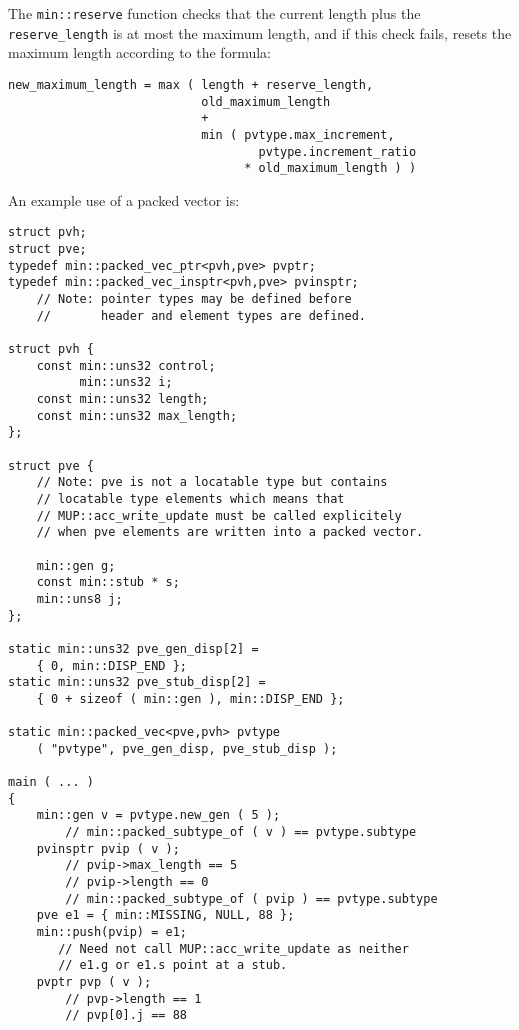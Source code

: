 \documentclass[12pt]{article}
\newenvironment{indpar}[1][0.3in]%
	{\begin{list}{}%
		     {\setlength{\itemsep}{0in}%
		      \setlength{\topsep}{0in}%
		      \setlength{\parsep}{1ex}%
		      \setlength{\labelwidth}{#1}%
		      \setlength{\leftmargin}{#1}%
		      \addtolength{\leftmargin}{\labelsep}}%
	 \item}%
	{\end{list}}
\begin{document}
The \verb|min::reserve| function checks that
the current length plus the \verb|reserve_length| is
at most the maximum length, and if this check fails,
resets the maximum length according to the formula:
\begin{indpar}\begin{verbatim}
new_maximum_length = max ( length + reserve_length,
                           old_maximum_length
                           +
                           min ( pvtype.max_increment,
                                   pvtype.increment_ratio
                                 * old_maximum_length ) )
\end{verbatim}\end{indpar}\label{PACKED-VEC-EXPANSION-FORMULA}

An example use of a packed vector is:
\begin{indpar}\begin{verbatim}
struct pvh;
struct pve;
typedef min::packed_vec_ptr<pvh,pve> pvptr;
typedef min::packed_vec_insptr<pvh,pve> pvinsptr;
    // Note: pointer types may be defined before
    //       header and element types are defined.

struct pvh {
    const min::uns32 control;
          min::uns32 i;
    const min::uns32 length;
    const min::uns32 max_length;
};

struct pve {
    // Note: pve is not a locatable type but contains
    // locatable type elements which means that
    // MUP::acc_write_update must be called explicitely
    // when pve elements are written into a packed vector.

    min::gen g;
    const min::stub * s;
    min::uns8 j;
};

static min::uns32 pve_gen_disp[2] =
    { 0, min::DISP_END };
static min::uns32 pve_stub_disp[2] =
    { 0 + sizeof ( min::gen ), min::DISP_END };

static min::packed_vec<pve,pvh> pvtype
    ( "pvtype", pve_gen_disp, pve_stub_disp );

main ( ... )
{
    min::gen v = pvtype.new_gen ( 5 );
        // min::packed_subtype_of ( v ) == pvtype.subtype
    pvinsptr pvip ( v );
        // pvip->max_length == 5
        // pvip->length == 0
        // min::packed_subtype_of ( pvip ) == pvtype.subtype
    pve e1 = { min::MISSING, NULL, 88 };
    min::push(pvip) = e1;
       // Need not call MUP::acc_write_update as neither
       // e1.g or e1.s point at a stub.
    pvptr pvp ( v );
        // pvp->length == 1
        // pvp[0].j == 88


\end{verbatim}
\end{indpar}
\end{document}
